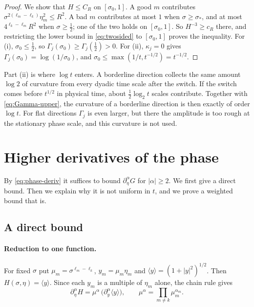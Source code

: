 \documentclass[11pt]{article}
\theoremstyle{remark}
\begin{document}
\begin{proof}
	We show that $H\le C_R$ on $[\sigma_0,1]$. A good $m$ contributes
	$\sigma^{2(\ell_m-\ell_k)}\eta_m^2\le R^2$. A bad $m$ contributes at most $1$ when
	$\sigma\ge\sigma_*$, and at most $4^{\ell_k-\ell_m}R^2$ when $\sigma\ge\frac12$; one
	of the two holds on $[\sigma_0,1]$. So $H^{-3}\ge c_R$ there, and restricting the
	lower bound in \eqref{eq:twosided} to $[\sigma_0,1]$ proves the inequality.
	For (i), $\sigma_0\le\frac12$, so $\Gamma_j(\sigma_0)\ge\Gamma_j(\frac12)>0$. For (ii),
	$\kappa_j=0$ gives $\Gamma_j(\sigma_0)=\log(1/\sigma_0)$, and
	$\sigma_0\le\max(1/t,t^{-1/2})=t^{-1/2}$.
\end{proof}

Part (ii) is where $\log t$ enters. A borderline direction collects the same amount
$\log2$ of curvature from every dyadic time scale after the switch. If the switch
comes before $t^{1/2}$ in physical time, about $\frac12\log_2t$ scales contribute.
Together with \eqref{eq:Gamma-upper}, the curvature of a borderline direction is
then exactly of order $\log t$. For flat directions $\Gamma_j$ is even larger, but
there the amplitude is too rough at the stationary phase scale, and this curvature
is not used.

\section{Higher derivatives of the phase}\label{sec:higher}

By \eqref{eq:phase-deriv} it suffices to bound $\partial_\eta^\alpha G$ for
$|\alpha|\ge2$. We first give a direct bound. Then we explain why it is not uniform
in $t$, and we prove a weighted bound that is.

\subsection{A direct bound}

\paragraph{Reduction to one function.} For fixed $\sigma$ put
$\mu_m=\sigma^{\ell_m-\ell_k}$, $y_m=\mu_m\eta_m$ and $\langle y\rangle=(1+|y|^2)^{1/2}$.
Then $H(\sigma,\eta)=\langle y\rangle$. Since each $y_m$ is a multiple of $\eta_m$
alone, the chain rule gives
\[
\partial_\eta^\alpha H=\mu^\alpha\,\big(\partial_y^\alpha\langle y\rangle\big),
\qquad\mu^\alpha=\prod_{m\ne k}\mu_m^{\alpha_m}.
\]
\end{document}
